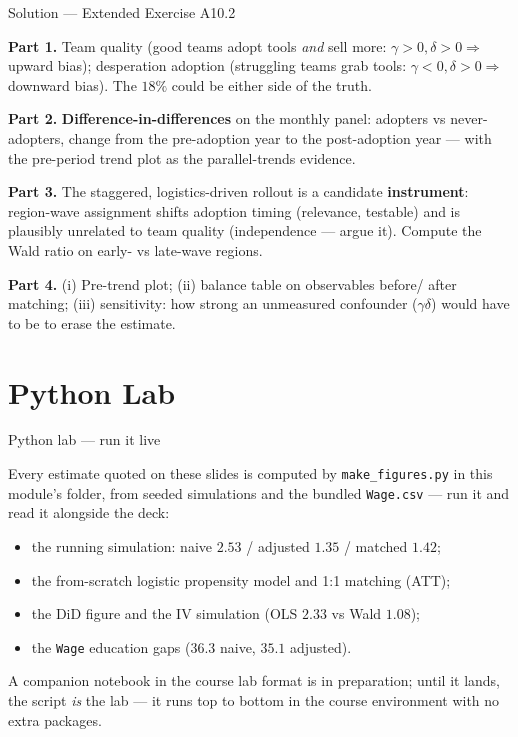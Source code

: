 \documentclass[aspectratio=169,11pt]{beamer}
\begin{document}
\begin{frame}{Solution --- Extended Exercise A10.2}
  \begin{solutionbox}
    \footnotesize
    \textbf{Part 1.} Team quality (good teams adopt tools \emph{and} sell more:
    $\gamma > 0, \delta > 0 \Rightarrow$ upward bias); desperation adoption
    (struggling teams grab tools: $\gamma < 0, \delta > 0 \Rightarrow$ downward
    bias). The $18\%$ could be either side of the truth.
    \par\smallskip
    \textbf{Part 2.} \textbf{Difference-in-differences} on the monthly panel:
    adopters vs never-adopters, change from the pre-adoption year to the
    post-adoption year --- with the pre-period trend plot as the parallel-trends
    evidence.
    \par\smallskip
    \textbf{Part 3.} The staggered, logistics-driven rollout is a candidate
    \textbf{instrument}: region-wave assignment shifts adoption timing (relevance,
    testable) and is plausibly unrelated to team quality (independence --- argue
    it). Compute the Wald ratio on early- vs late-wave regions.
    \par\smallskip
    \textbf{Part 4.} (i) Pre-trend plot; (ii) balance table on observables before/
    after matching; (iii) sensitivity: how strong an unmeasured confounder
    ($\gamma\delta$) would have to be to erase the estimate.
  \end{solutionbox}
\end{frame}

\section{Python Lab}

\begin{frame}{Python lab --- run it live}
  \begin{labnote}
    Every estimate quoted on these slides is computed by
    \texttt{make\_figures.py} in this module's folder, from seeded simulations and
    the bundled \texttt{Wage.csv} --- run it and read it alongside the deck:
    \begin{itemize}
      \item the running simulation: naive $2.53$ / adjusted $1.35$ / matched $1.42$;
      \item the from-scratch logistic propensity model and 1:1 matching (ATT);
      \item the DiD figure and the IV simulation (OLS $2.33$ vs Wald $1.08$);
      \item the \texttt{Wage} education gaps ($36.3$ naive, $35.1$ adjusted).
    \end{itemize}
    A companion notebook in the course lab format is in preparation; until it
    lands, the script \emph{is} the lab --- it runs top to bottom in the course
    environment with no extra packages.
  \end{labnote}
\end{frame}
\end{document}
